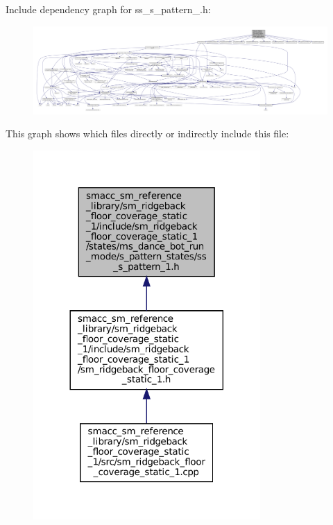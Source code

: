 Include dependency graph for ss\+\_\+s\+\_\+pattern\+\_.\+h\+:
\nopagebreak
\begin{figure}[H]
\begin{center}
\leavevmode
\includegraphics[width=350pt]{sm__ridgeback__floor__coverage__static__1_2include_2sm__ridgeback__floor__coverage__static__1_2sc68df2947665f56c172ff0a01673a14b}
\end{center}
\end{figure}
This graph shows which files directly or indirectly include this file\+:
\nopagebreak
\begin{figure}[H]
\begin{center}
\leavevmode
\includegraphics[width=245pt]{sm__ridgeback__floor__coverage__static__1_2include_2sm__ridgeback__floor__coverage__static__1_2s57bec889f23632d1b75470346c839907}
\end{center}
\end{figure}
